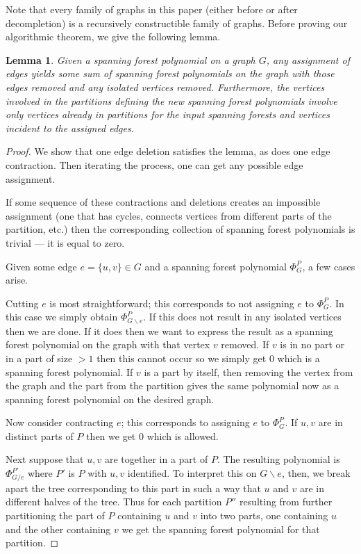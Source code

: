 \documentclass[12pt]{amsart}
\newtheorem{lemma}[definition]{Lemma}
\numberwithin{definition}{section}
\begin{document}
Note that every family of graphs in this paper (either before or after decompletion) is a recursively constructible family of graphs.
Before proving our algorithmic theorem, we give the following lemma. 
\begin{lemma}\label{lem process edges}
	Given a spanning forest polynomial on a graph $G$, any assignment of edges yields some sum of spanning forest polynomials on the graph with those edges removed and any isolated vertices removed.  Furthermore, the vertices involved in the partitions defining the new spanning forest polynomials involve only vertices already in partitions for the input spanning forests and vertices incident to the assigned edges.
\end{lemma}
\begin{proof}
  We show that one edge deletion satisfies the lemma, as does one edge contraction. Then iterating the process, one can get any possible edge assignment.
  
  If some sequence of these contractions and deletions creates an impossible assignment (one that has cycles, connects vertices from different parts of the partition, etc.) then the corresponding collection of spanning forest polynomials is trivial --- it is equal to zero.
  
	Given some edge $e=\{u,v\}\in G$ and a spanning forest polynomial $\Phi_G^P$, a few cases arise.

        Cutting $e$ is most straightforward; this corresponds to not assigning $e$ to $\Phi_G^P$.  In this case we simply obtain $\Phi_{G\backslash e}^P$.  If this does not result in any isolated vertices then we are done.  If it does then we want to express the result as a spanning forest polynomial on the graph with that vertex $v$ removed.  If $v$ is in no part or in a part of size $>1$ then this cannot occur so we simply get $0$ which is a spanning forest polynomial.  If $v$ is a part by itself, then removing the vertex from the graph and the part from the partition gives the same polynomial now as a spanning forest polynomial on the desired graph.

        Now consider contracting $e$; this corresponds to assigning $e$ to $\Phi_G^P$.  If $u, v$ are in distinct parts of $P$ then we get $0$ which is allowed.

        Next suppose that $u,v$ are together in a part of $P$.  The resulting polynomial is $\Phi_{G/e}^{P'}$ where $P'$ is $P$ with $u,v$ identified.  To interpret this on $G\backslash e$, then, we break apart the tree corresponding to this part in such a way that $u$ and $v$ are in different halves of the tree.  Thus for each partition $P''$ resulting from further partitioning the part of $P$ containing $u$ and $v$ into two parts, one containing $u$ and the other containing $v$ we get the spanning forest polynomial for that partition.


\end{proof}
\end{document}
